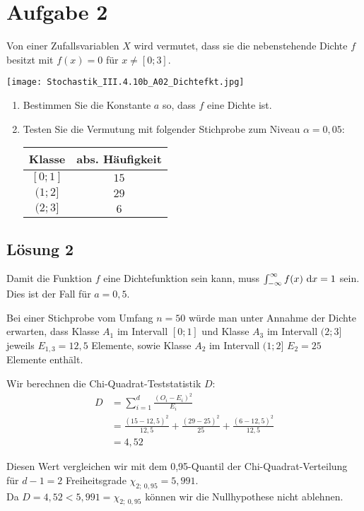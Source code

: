 \documentclass[main.tex]{subfiles}
\begin{document}
\section{Aufgabe 2}
Von einer Zufallsvariablen $X$ wird vermutet, dass sie die nebenstehende Dichte $f$ besitzt mit $f(x) = 0$ für $x \neq [0; 3]$.
\begin{center}
	\texttt{[image: Stochastik\_III.4.10b\_A02\_Dichtefkt.jpg]}
\end{center}
\begin{enumerate}
\item Bestimmen Sie die Konstante $a$ so, dass $f$ eine Dichte ist.
\item Testen Sie die Vermutung mit folgender Stichprobe zum Niveau $\alpha = 0,05$:
\begin{center}
	\begin{tabular}{c|c}
		Klasse & abs. Häufigkeit \\ \hline
		$[0; 1]$ & $15$ \\
		$(1; 2]$ & $29$ \\
		$(2; 3]$ & $6$
	\end{tabular}
\end{center}
\end{enumerate}

\subsection{Lösung 2}
Damit die Funktion $f$ eine Dichtefunktion sein kann, muss $\int_{-\infty}^{\infty} f(x) ~\mathrm{d}x = 1$ sein. Dies ist der Fall für $a = 0,5$.

Bei einer Stichprobe vom Umfang $n = 50$ würde man unter Annahme der Dichte erwarten, dass Klasse $A_1$ im Intervall $[0; 1]$ und Klasse $A_3$ im Intervall $(2; 3]$ jeweils $E_{1,3} = 12,5$ Elemente, sowie Klasse $A_2$ im Intervall $(1; 2]$ $E_{2}=25$ Elemente enthält.  

Wir berechnen die Chi-Quadrat-Teststatistik $D$:
$$\begin{aligned}
	D &= \sum_{i=1}^{d} \frac{(O_i - E_i)^2}{E_i} \\
	&= \frac{(15 - 12,5)^2}{12,5} + \frac{(29-25)^2}{25} + \frac{(6-12,5)^2}{12,5} \\
	&= 4,52
\end{aligned}$$

Diesen Wert vergleichen wir mit dem 0,95-Quantil der Chi-Quadrat-Verteilung für $d-1 = 2$ Freiheitsgrade $\chi_{2;\ 0,95} = 5,991$.\\

Da $D=4,52 < 5,991 = \chi_{2;\ 0,95}$ können wir die Nullhypothese nicht ablehnen.
\end{document}
